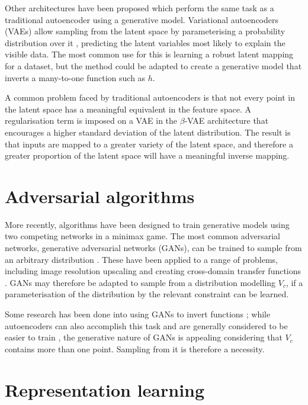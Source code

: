 \documentclass[../../main.tex]{subfiles}
\begin{document}
Other architectures have been proposed which perform the same task as a traditional autoencoder using a generative model.
Variational autoencoders (VAEs) allow sampling from the latent space by parameterising a probability distribution over it \cite{kingma14}, predicting the latent variables most likely to explain the visible data.
The most common use for this is learning a robust latent mapping for a dataset, but the method could be adapted to create a generative model that inverts a many-to-one function such as $h$.

A common problem faced by traditional autoencoders is that not every point in the latent space has a meaningful equivalent in the feature space.
A regularisation term is imposed on a VAE in the $\beta$-VAE architecture \cite{higgins16} that encourages a higher standard deviation of the latent distribution.
The result is that inputs are mapped to a greater variety of the latent space, and therefore a greater proportion of the latent space will have a meaningful inverse mapping.

\section{Adversarial algorithms} \label{section:adversarialAlgorithms}

More recently, algorithms have been designed to train generative models using two competing networks in a minimax game.
The most common adversarial networks, generative adversarial networks (GANs), can be trained to sample from an arbitrary distribution \cite{goodfellow14, horger18}.
These have been applied to a range of problems, including image resolution upscaling \cite{ledig17} and creating cross-domain transfer functions \cite{zhu18}.
GANs may therefore be adapted to sample from a distribution modelling $V_c$, if a parameterisation of the distribution by the relevant constraint can be learned.

Some research has been done into using GANs to invert functions \cite{anirudh18}; while autoencoders can also accomplish this task and are generally considered to be easier to train \cite{bang18}, the generative nature of GANs is appealing considering that $V_c$ contains more than one point.
Sampling from it is therefore a necessity.

\section{Representation learning} \label{section:representationLearning}
\end{document}
